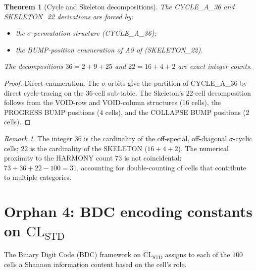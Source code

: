 \documentclass[11pt,reqno]{amsart}
\theoremstyle{plain}
\newtheorem{theorem}{Theorem}[section]
\theoremstyle{definition}
\theoremstyle{remark}
\newtheorem*{remark}{Remark}
\newcommand{\STD}{\mathrm{STD}}
\begin{document}
\begin{theorem}[Cycle and Skeleton decompositions]\label{thm:cs}
The CYCLE\_A\_36 and SKELETON\_22 derivations are forced by:
\begin{itemize}
\item the $\sigma$-permutation structure (CYCLE\_A\_36);
\item the BUMP-position enumeration of A9 of \cite{SandersForcing}
(SKELETON\_22).
\end{itemize}
The decompositions $36 = 2 + 9 + 25$ and $22 = 16 + 4 + 2$ are
exact integer counts.
\end{theorem}

\begin{proof}
Direct enumeration. The $\sigma$-orbits give the partition of
CYCLE\_A\_36 by direct cycle-tracing on the $36$-cell sub-table.
The Skeleton's $22$-cell decomposition follows from the VOID-row and
VOID-column structures (16 cells), the PROGRESS BUMP positions (4
cells), and the COLLAPSE BUMP positions (2 cells).
\end{proof}

\begin{remark}
The integer $36$ is the cardinality of the off-special, off-diagonal
$\sigma$-cyclic cells; $22$ is the cardinality of the SKELETON
($16 + 4 + 2$). The numerical proximity to the HARMONY count $73$ is
not coincidental: $73 + 36 + 22 - 100 = 31$, accounting for
double-counting of cells that contribute to multiple categories.
\end{remark}

\section{Orphan 4: BDC encoding constants on $\mathrm{CL}_\STD$}
\label{sec:bdc}

The Binary Digit Code (BDC) framework on $\mathrm{CL}_\STD$ assigns to
each of the $100$ cells a Shannon information content based on the
cell's role.
\end{document}
